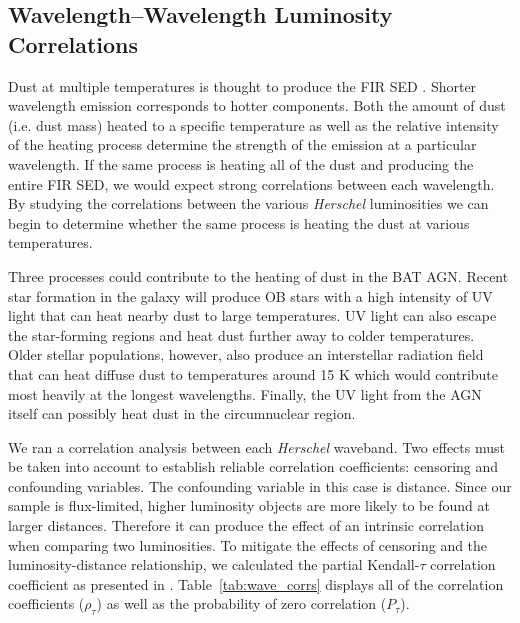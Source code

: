 \subsection{Wavelength--Wavelength Luminosity Correlations}
Dust at multiple temperatures is thought to produce the FIR SED \citep{Draine:2003gd}. Shorter wavelength emission corresponds to hotter components. Both the amount of dust (i.e. dust mass) heated to a specific temperature as well as the relative intensity of the heating process determine the strength of the emission at a particular wavelength. If the same process is heating all of the dust and producing the entire FIR SED, we would expect strong correlations between each wavelength. By studying the correlations between the various \textit{Herschel} luminosities we can begin to determine whether the same process is heating the dust at various temperatures.

Three processes could contribute to the heating of dust in the BAT AGN. Recent star formation in the galaxy will produce OB stars with a high intensity of UV light that can heat nearby dust to large temperatures. UV light can also escape the star-forming regions and heat dust further away to colder temperatures. Older stellar populations, however, also produce an interstellar radiation field that can heat diffuse dust to temperatures around 15 K which would contribute most heavily at the longest wavelengths. Finally, the UV light from the AGN itself can possibly heat dust in the circumnuclear region.

We ran a correlation analysis between each \textit{Herschel} waveband. Two effects must be taken into account to establish reliable correlation coefficients: censoring and confounding variables. The confounding variable in this case is distance. Since our sample is flux-limited, higher luminosity objects are more likely to be found at larger distances. Therefore it can produce the effect of an intrinsic correlation when comparing two luminosities. To mitigate the effects of censoring and the luminosity-distance relationship, we calculated the partial Kendall-$\tau$ correlation coefficient as presented in \citet{Akritas_1996}. Table~\ref{tab:wave_corrs} displays all of the correlation coefficients ($\rho_{\tau}$) as well as the probability of zero correlation ($P_{\tau}$). 
  